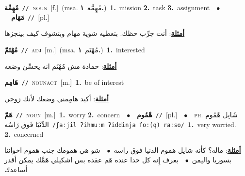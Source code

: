 \documentclass[10pt,a4paper,twoside]{article} %
\begin{document}
\begin{multicols}{2}
{\setlength\topsep{0pt}\textbf{\foreignlanguage{arabic}{مُهِمِّة}}\ {\color{gray}\texttt{//}\color{black}}\ \textsc{noun}\ [f.]\ \color{gray}(msa. \foreignlanguage{arabic}{مُهِمَّة}~\foreignlanguage{arabic}{\textbf{١.}})\color{black}\ \textbf{1.}~mission  \textbf{2.}~task  \textbf{3.}~assignment\ \ $\bullet$\ \ \setlength\topsep{0pt}\textbf{\foreignlanguage{arabic}{مَهَام}}\ {\color{gray}\texttt{//}\color{black}}\ [pl.]\  \begin{flushright}\color{gray}\foreignlanguage{arabic}{\textbf{\underline{\foreignlanguage{arabic}{أمثلة}}}: أنت جرِّب حظك. بتعطيه شوية مهام وبتشوف كيف بينجزها}\end{flushright}\color{black}} \vspace{2mm}

{\setlength\topsep{0pt}\textbf{\foreignlanguage{arabic}{مُهْتَمّ}}\ {\color{gray}\texttt{//}\color{black}}\ \textsc{adj}\ [m.]\ \color{gray}(msa. \foreignlanguage{arabic}{مُهْتَم}~\foreignlanguage{arabic}{\textbf{١.}})\color{black}\ \textbf{1.}~interested\  \begin{flushright}\color{gray}\foreignlanguage{arabic}{\textbf{\underline{\foreignlanguage{arabic}{أمثلة}}}: حمادة مش مُهْتَم انه يحسِّن وضعه}\end{flushright}\color{black}} \vspace{2mm}

{\setlength\topsep{0pt}\textbf{\foreignlanguage{arabic}{هَامِم}}\ {\color{gray}\texttt{//}\color{black}}\ \textsc{noun\textunderscore act}\ [m.]\ \textbf{1.}~be of interest\  \begin{flushright}\color{gray}\foreignlanguage{arabic}{\textbf{\underline{\foreignlanguage{arabic}{أمثلة}}}: أكيد هامِمني وضعك لأنك زوجي}\end{flushright}\color{black}} \vspace{2mm}

{\setlength\topsep{0pt}\textbf{\foreignlanguage{arabic}{هَمّ}}\ {\color{gray}\texttt{//}\color{black}}\ \textsc{noun}\ [m.]\ \textbf{1.}~worry  \textbf{2.}~concern\ \ $\bullet$\ \ \setlength\topsep{0pt}\textbf{\foreignlanguage{arabic}{هْمُوم}}\ {\color{gray}\texttt{//}\color{black}}\ [pl.]\ \ $\bullet$\ \ \textsc{ph.} \color{gray} \foreignlanguage{arabic}{شَايِل هْمُوم الدِّنْيَا فَوق رَاسُه}\color{black}\ {\color{gray}\texttt{/{\sffamily ʃaːjil ʔihmuːm ʔiddinja foː(q) raːso}/}\color{black}}\ \textbf{1.}~very worried.  \textbf{2.}~concerned\  \begin{flushright}\color{gray}\foreignlanguage{arabic}{\textbf{\underline{\foreignlanguage{arabic}{أمثلة}}}: ماله؟ كأنه شايل هموم الدنيا فوق راسه\ $\bullet$\ \  شو هي همومك جنب هموم اخواننا بسوريا واليمن\ $\bullet$\ \  بعرف إِنه كل حدا عنده هَم عقده بس اشكيلي هَمَّك يمكن أقدر أساعدك}\end{flushright}\color{black}} \vspace{2mm}


\end{multicols}
\end{document}
